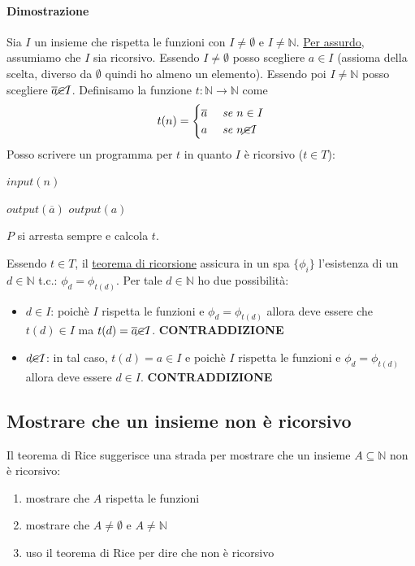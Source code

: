 \documentclass{article}
\begin{document}
\paragraph{Dimostrazione}
Sia $I$ un insieme che rispetta le funzioni con $I\neq \emptyset$ e $I\neq \mathbb{N}$. \underline{Per assurdo}, assumiamo che $I$ sia ricorsivo. Essendo $I \neq \emptyset$ posso scegliere $ a \in I$ (assioma della scelta, diverso da $\emptyset$ quindi ho almeno un elemento). Essendo poi $I \neq \mathbb{N}$ posso scegliere $\overline{a} \cancel{\in} I$.
Definisamo la funzione $t:\mathbb{N} \rightarrow \mathbb{N}$ come
\begin{displaymath}
	t(n)=\begin{cases}
		\overline{a} &\textit{ se } n \in I \\
		{a} &\textit{ se } n \cancel{\in} I
	\end{cases}
\end{displaymath}
Posso scrivere un programma per $t$ in quanto $I$ è ricorsivo ($t \in T$):
\begin{algorithm}[h]
	\caption{$P \equiv$}
        \begin{algorithmic}[1]
			\State $input(n)$

        			\State $output(\overline{a})$
        		\Else
        			\State $output(a)$
        		\EndIf
        		
        \end{algorithmic}
    \end{algorithm}
$P$ si arresta sempre e calcola $t$.




Essendo $t \in T$, il \underline{teorema di ricorsione} assicura in un spa $\{ \phi_i \}$ l'esistenza di un $d \in \mathbb{N}$ t.c.: $\phi_d=\phi_{t(d)}$.
Per tale $d \in \mathbb{N}$ ho due possibilità:
\begin{itemize}
	\item $d \in I$: poichè $I$ rispetta le funzioni e $\phi_d = \phi_{t(d)}$ allora deve essere che $t(d) \in I$ ma $t(d)=\overline{a} \cancel{\in} I$. \textbf{CONTRADDIZIONE}
	\item $d \cancel{\in} I$: in tal caso, $t(d)=a \in I$ e poichè $I$ rispetta le funzioni e $\phi_d=\phi_{t(d)}$ allora deve essere $d \in I$. \textbf{CONTRADDIZIONE}
\end{itemize}
\subsection{Mostrare che un insieme non è ricorsivo}
Il teorema di Rice suggerisce una strada per mostrare che un insieme $A \subseteq \mathbb{N}$ non è ricorsivo:
\begin{enumerate}
	\item mostrare che $A$ rispetta le funzioni
	\item mostrare che $A \neq \emptyset$ e $A \neq \mathbb{N}$
	\item uso il teorema di Rice per dire che non è ricorsivo
\end{enumerate}
\end{document}
